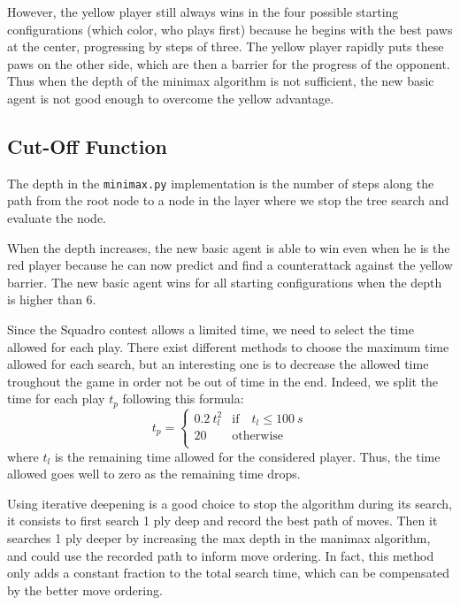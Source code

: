 \documentclass[journal,onecolumn]{IEEEtran}
\newcommand{\py}[1]{\texttt{#1}}
\begin{document}
However, the yellow player still always wins in the four possible starting configurations (which color, who plays first) because he begins with the best paws at the center, progressing by steps of three. The yellow player rapidly puts these paws on the other side, which are then a barrier for the progress of the opponent.
Thus when the depth of the minimax algorithm is not sufficient, the new basic agent is not good enough to overcome the yellow advantage.

\subsection{Cut-Off Function}

The depth in the \py{minimax.py} implementation is the number of steps along the path from the root node to a node in the layer where we stop the tree search and evaluate the node.

When the depth increases, the new basic agent is able to win even when he is the red player because he can now predict and find a counterattack against the yellow barrier. The new basic agent wins for all starting configurations when the depth is higher than 6.

Since the Squadro contest allows a limited time, we need to select the time allowed for each play.
There exist different methods to choose the maximum time allowed for each search, but an interesting one is to decrease the allowed time troughout the game in order not be out of time in the end. Indeed, we split the time for each play $t_{p}$ following this formula:
\[
    t_{p} = 
    \left\{
    \begin{array}{ll}
      0.2 \: t_{l}^2 & \mathrm{if}\quad t_{l}\leq \SI{100}{s} \\
      20 & \mathrm{otherwise} \\
    \end{array} 
    \right.
\]
where $t_l$ is the remaining time allowed for the considered player. Thus, the time allowed goes well to zero as the remaining time drops.

Using iterative deepening is a good choice to stop the algorithm during its search, it consists to first search 1 ply deep and record the best path of moves. Then it searches 1 ply deeper by increasing the max depth in the manimax algorithm, and could use the recorded path to inform move ordering. In fact, this method only adds a constant fraction to the total search time, which can be compensated by the better move ordering.
\end{document}
